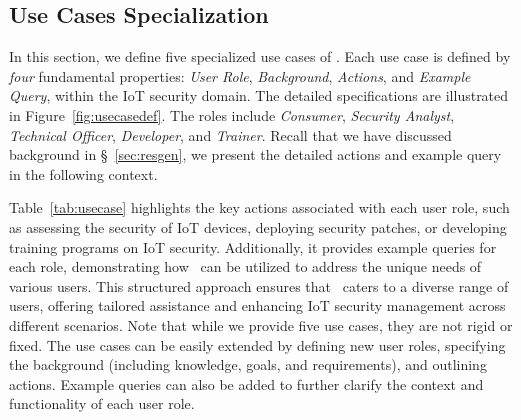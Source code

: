 \subsection{Use Cases Specialization}\label{sec:usecase}





In this section, we define five specialized use cases of \chatiot. 
Each use case is defined by \textit{four} fundamental properties: \textit{User Role}, \textit{Background}, \textit{Actions}, and \textit{Example Query}, within the IoT security domain.
The detailed specifications are illustrated in Figure~\ref{fig:usecasedef}.
The roles include \textit{Consumer}, \textit{Security Analyst}, \textit{Technical Officer}, \textit{Developer}, and \textit{Trainer}. 
Recall that we have discussed background in \S~\ref{sec:resgen}, we present the detailed actions and example query in the following context.


Table~\ref{tab:usecase} highlights the key actions associated with each user role, such as assessing the security of IoT devices, deploying security patches, or developing training programs on IoT security.
Additionally, it provides example queries for each role, demonstrating how \chatiot\ can be utilized to address the unique needs of various users. 
This structured approach ensures that \chatiot\ caters to a diverse range of users, offering tailored assistance and enhancing IoT security management across different scenarios.
Note that while we provide five use cases, they are not rigid or fixed. 
The use cases can be easily extended by defining new user roles, specifying the background (including knowledge, goals, and requirements), and outlining actions. Example queries can also be added to further clarify the context and functionality of each user role.

